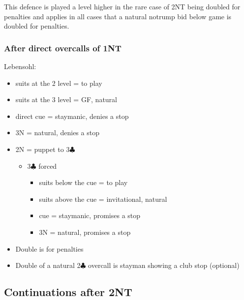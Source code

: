 \documentclass[a4paper,14pt]{extarticle}
\begin{document}
This defence is played a level higher in the rare case of 2NT being doubled for
penalties and applies in all cases that a natural notrump bid below game is doubled for
penalties.

\subsubsection{After direct overcalls of 1NT}
\label{sec:resp:lebensohl}

Lebensohl:

\begin{itemize}
\item suits at the 2 level = to play
\item suits at the 3 level = GF, natural
\item direct cue = staymanic, denies a stop
\item 3N = natural, denies a stop
\item 2N = puppet to 3$\clubsuit$
	\begin{itemize}
	\item 3$\clubsuit$ forced
		\begin{itemize}
		\item suits below the cue = to play
		\item suits above the cue = invitational, natural
		\item cue = staymanic, promises a stop
		\item 3N = natural, promises a stop
		\end{itemize}
	\end{itemize}
\item Double is for penalties
\item Double of a natural 2$\clubsuit$ overcall is stayman showing a club stop (optional)
\end{itemize}

\newpage

\subsection{Continuations after 2NT}
\label{sec:resp:2n}
\end{document}
